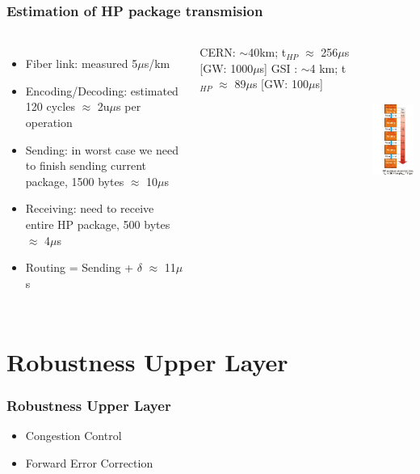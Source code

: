 \documentclass[]{beamer}
\begin{document}
\begin{frame}
  \frametitle{Estimation of HP package transmision}   %
  \begin{columns}[c]
  \column{3in}  %
  \begin{itemize}
  \item Fiber link: measured 5$\mu$s/km
  \item Encoding/Decoding: estimated 120 cycles $\approx$ 2u$\mu$s per operation
  \item Sending: in worst case we need to finish sending current package, 1500 bytes $\approx$ 10$\mu$s
  \item Receiving: need to receive entire HP package, 500 bytes $\approx$ 4$\mu$s
  \item Routing = Sending + $\delta$ $\approx$ 11$\mu$s
  \end{itemize}

CERN: $\sim$40km; t$_{HP}$ $\approx$ 256$\mu$s [GW: 1000$\mu$s]
GSI : $\sim$4 km; t$_{HP}$ $\approx$  89$\mu$s [GW:  100$\mu$s]

  \column{3in}

  \includegraphics[height=6.2cm,keepaspectratio]{robustness/granuality_window}

  \end{columns}
\end{frame}

\section{Robustness Upper Layer}

\begin{frame}
  \frametitle{Robustness Upper Layer}   %

  \begin{itemize}
  \item Congestion Control
  \item Forward Error Correction
  \end{itemize}
\end{frame}
\end{document}
